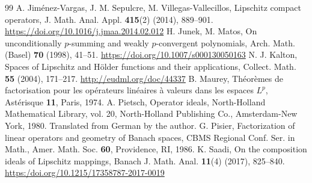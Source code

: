 \documentclass[12pt]{amsart}
\begin{document}
\begin{thebibliography}{99}
	 A. Jiménez-Vargas, J. M. Sepulcre, M. Villegas-Vallecillos, Lipschitz compact operators, J. Math. Anal. Appl. \textbf{415}(2) (2014), 889--901. \url{https://doi.org/10.1016/j.jmaa.2014.02.012}
	 H. Junek, M. Matos, On unconditionally $p$-summing and weakly $p$-convergent polynomials, Arch. Math. (Basel) \textbf{70} (1998), 41--51. \url{https://doi.org/10.1007/s000130050163}
	 N. J. Kalton, Spaces of Lipschitz and H{\"o}lder functions and their applications, Collect. Math. \textbf{55} (2004), 171--217. \url{http://eudml.org/doc/44337}
	 B. Maurey, Théorèmes de factorisation pour les opérateurs linéaires à valeurs dans les espaces $L^p$, Astérisque \textbf{11}, Paris, 1974.
	 A. Pietsch, Operator ideals, North-Holland Mathematical Library, vol. 20, North-Holland Publishing Co., Amsterdam-New York, 1980. Translated from German by the author.
	 G. Pisier, Factorization of linear operators and geometry of Banach spaces, CBMS Regional Conf. Ser. in Math., Amer. Math. Soc. \textbf{60}, Providence, RI, 1986.
	 K. Saadi, On the composition ideals of Lipschitz mappings, Banach J. Math. Anal. \textbf{11}(4) (2017), 825--840. \url{https:/doi.org/10.1215/17358787-2017-0019}
\end{thebibliography}
\end{document}
